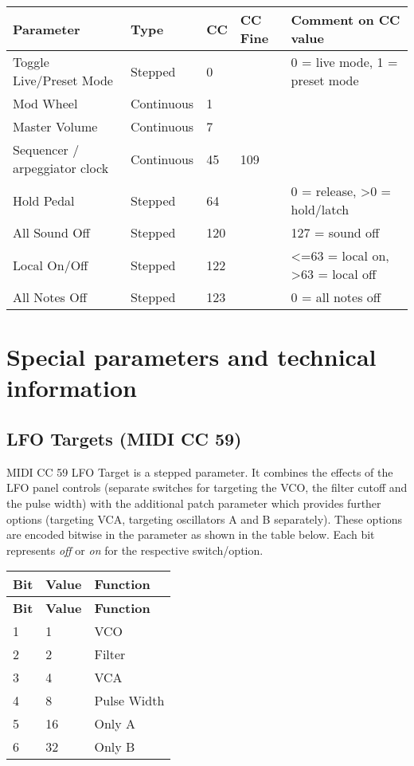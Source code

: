 \begin{longtable}[l]{ p{6cm}|p{2.5cm}|p{1.5cm}|p{2cm}|p{7cm}} 
\textbf{Parameter} & \textbf{Type} & \textbf{CC} & \textbf{CC Fine} & \textbf{Comment on CC value} \\ \hline
Toggle Live/Preset Mode & Stepped & 0 & & 0 = live mode, 1 = preset mode \\ \hline
Mod Wheel & Continuous & 1 & & \\ \hline
Master Volume & Continuous & 7 & & \\ \hline
Sequencer / arpeggiator clock & Continuous & 45 & 109 & \\ \hline
Hold Pedal & Stepped & 64 & & 0 = release, >0 = hold/latch\\ \hline
All Sound Off & Stepped & 120 & & 127 = sound off\\ \hline
Local On/Off & Stepped & 122 & & <=63 = local on, >63 = local off \\ \hline
All Notes Off & Stepped & 123 & & 0 = all notes off\\ \hline
\end{longtable}

\section{Special parameters and technical information}

\subsection*{LFO Targets (MIDI CC 59)}\label{lfotarget}

MIDI CC 59 LFO Target is a stepped parameter. It combines the effects of the LFO panel controls (separate switches for targeting the VCO, the filter cutoff and the pulse width) with the additional patch parameter which provides further options (targeting VCA, targeting oscillators A and B separately). These options are encoded bitwise in the parameter as shown in the table below. Each bit represents \textit{off} or \textit{on} for the respective switch/option. 

\renewcommand{\arraystretch}{1.3}

\begin{longtable}[l]{p{1.2cm}|p{2cm}|p{4cm}} 
\textbf{Bit} & \textbf{Value} & \textbf{Function} \\ \hline
\endfirsthead
\textbf{Bit} & \textbf{Value} & \textbf{Function} \\ \hline
\endhead 
1 & 1 & VCO \\ \hline 
2 & 2 & Filter \\ \hline 
3 & 4 & VCA \\ \hline 
4 & 8 & Pulse Width \\ \hline 
5 & 16 & Only A \\ \hline 
6 & 32& Only B \\ \hline 
\end{longtable}


